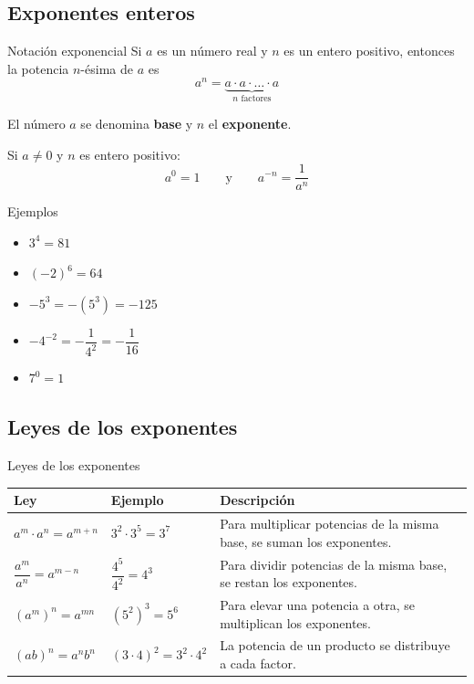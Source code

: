 \documentclass[10pt,handout,aspectratio=169]{beamer}
\begin{document}
	\subsection{Exponentes enteros}
	
	\begin{frame}{Notación exponencial}
		Si $a$ es un número real y $n$ es un entero positivo, entonces la potencia $n$-ésima de $a$ es
		\[
		a^{n}=\underbrace{a\cdot a\cdot \ldots \cdot a}_{n\text{ factores}}
		\]
		
		El número $a$ se denomina \textbf{base} y $n$ el \textbf{exponente}.
		
		\medskip
		
		Si $a\neq 0$ y $n$ es entero positivo:
		\[
		a^{0}=1
		\qquad\text{y}\qquad
		a^{-n}=\frac{1}{a^{n}}
		\]
		
		\begin{block}{Ejemplos}
			\begin{itemize}
				\item $3^{4}=81$
				\item $(-2)^{6}=64$
				\item $-5^{3}=-(5^{3})=-125$
				\item $-4^{-2}=-\dfrac{1}{4^{2}}=-\dfrac{1}{16}$
				\item $7^{0}=1$
			\end{itemize}
		\end{block}
	\end{frame}
	
	\subsection{Leyes de los exponentes}
	
	\begin{frame}{Leyes de los exponentes}
		\small
		\begin{tabular}{>{\raggedright\arraybackslash}p{} >{\raggedright\arraybackslash}p{} >{\raggedright\arraybackslash}p{}}
			\toprule
			\textbf{Ley} & \textbf{Ejemplo} & \textbf{Descripción} \\
			\midrule
			$a^{m}\cdot a^{n}=a^{m+n}$ & $3^{2}\cdot 3^{5}=3^{7}$ & Para multiplicar potencias de la misma base, se suman los exponentes. \\[0.4em]
			$\dfrac{a^{m}}{a^{n}}=a^{m-n}$ & $\dfrac{4^{5}}{4^{2}}=4^{3}$ & Para dividir potencias de la misma base, se restan los exponentes. \\[0.4em]
			$(a^{m})^{n}=a^{mn}$ & $(5^{2})^{3}=5^{6}$ & Para elevar una potencia a otra, se multiplican los exponentes. \\[0.4em]
			$(ab)^{n}=a^{n}b^{n}$ & $(3\cdot 4)^{2}=3^{2}\cdot 4^{2}$ & La potencia de un producto se distribuye a cada factor. \\
			\bottomrule
		\end{tabular}
	\end{frame}
	
\end{document}
